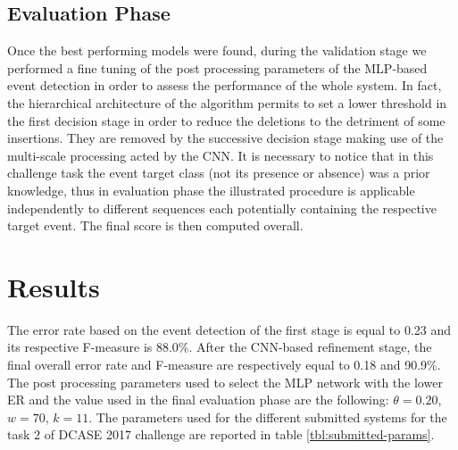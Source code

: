 \documentclass{article}
\begin{document}
\begin{sloppy}
\subsection{Evaluation Phase}
Once the best performing models were found, during the validation stage we performed a fine tuning of the post processing parameters of the MLP-based event detection in order to assess the performance of the whole system. In fact, the hierarchical architecture of the algorithm permits to set a lower threshold in the first decision stage in order to reduce the deletions to the detriment of some insertions. They are removed by the successive decision stage making use of the multi-scale processing acted by the CNN. 
It is necessary to notice that in this challenge task the event target class (not its presence or absence) was a prior knowledge, thus in evaluation phase the illustrated procedure is applicable independently to different sequences each potentially containing the respective target event. The final score is then computed overall.

\section{Results}
\label{sec:results}
The error rate based on the event detection of the first stage is equal to 0.23 and its respective F-measure is 88.0\%. 
After the CNN-based refinement stage, the final overall error rate and F-measure are respectively equal to 0.18 and 90.9\%. 
The post processing parameters used to select the MLP network with the lower ER and the value used in the final evaluation phase are the following:
$\theta=0.20$, $w=70$, $k=11$. The parameters used for the different submitted systems for the task 2 of DCASE 2017 challenge are reported in table \ref{tbl:submitted-params}.


\end{sloppy}
\end{document}
